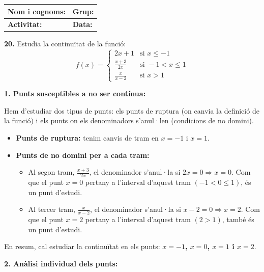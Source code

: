 \documentclass[12pt,a4paper]{article}
\begin{document}
\begingroup
\renewcommand{\arraystretch}{2.2}
\begin{tabularx}{\textwidth}{|X|p{4cm}|}
    \hline
    \textbf{Nom i cognoms:} & \textbf{Grup:} \\ \hline
    \textbf{Activitat:} & \textbf{Data:} \\ \hline
\end{tabularx}
\endgroup

\vspace{1cm}

\textbf{20.} Estudia la continuïtat de la funció:
\[
f(x) = \begin{cases} 
2x + 1 & \text{si } x \le -1 \\ 
\frac{x + 3}{2x} & \text{si } -1 < x \le 1 \\ 
\frac{x}{x - 2} & \text{si } x > 1 
\end{cases}
\]

\vspace{0.5cm}
\textbf{1. Punts susceptibles a no ser contínua:}
\vspace{0.2cm}

Hem d'estudiar dos tipus de punts: els punts de ruptura (on canvia la definició de la funció) i els punts on els denominadors s'anul·len (condicions de no domini).

\begin{itemize}
    \item \textbf{Punts de ruptura:} tenim canvis de tram en $x = -1$ i $x = 1$.
    \item \textbf{Punts de no domini per a cada tram:}
    \begin{itemize}
        \item Al segon tram, $\frac{x + 3}{2x}$, el denominador s'anul·la si $2x = 0 \Rightarrow x = 0$. Com que el punt $x = 0$ pertany a l'interval d'aquest tram $(-1 < 0 \le 1)$, és un punt d'estudi.
        \item Al tercer tram, $\frac{x}{x - 2}$, el denominador s'anul·la si $x - 2 = 0 \Rightarrow x = 2$. Com que el punt $x = 2$ pertany a l'interval d'aquest tram $(2 > 1)$, també és un punt d'estudi.
    \end{itemize}
\end{itemize}

En resum, cal estudiar la continuïtat en els punts: \textbf{$x = -1$, $x = 0$, $x = 1$ i $x = 2$}.

\vspace{0.5cm}
\textbf{2. Anàlisi individual dels punts:}
\vspace{0.2cm}
\end{document}
